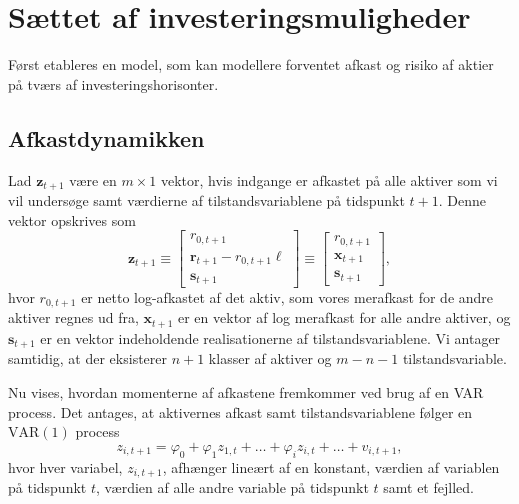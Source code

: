 \documentclass[
  a4paper,
  oneside]{memoir}
\begin{document}
\section{Sættet af investeringsmuligheder}

Først etableres en model, som kan modellere forventet afkast og risiko af aktier på tværs af investeringshorisonter.

\subsection{Afkastdynamikken}

Lad \(\bm{z}_{t+1}\) være en \(m\times 1\) vektor, hvis indgange er afkastet på alle aktiver som vi vil undersøge samt værdierne af tilstandsvariablene på tidspunkt \(t+1\). Denne vektor opskrives som
\begin{equation}
        \bm{z}_{t+1}\equiv
        \begin{bmatrix}
        r_{0,t+1}\\
        \bm{r}_{t+1}-r_{0,t+1}\bm{\ell}\\
        \bm{s}_{t+1}
        \end{bmatrix}\equiv
        \begin{bmatrix}
        r_{0,t+1}\\
        \bm{x}_{t+1}\\
        \bm{s}_{t+1}
        \end{bmatrix},
    \end{equation}
hvor \(r_{0,t+1}\) er netto log-afkastet af det aktiv, som vores merafkast for de andre aktiver regnes ud fra, \(\bm{x}_{t+1}\) er en vektor af log merafkast for alle andre aktiver, og \(\bm{s}_{t+1}\) er en vektor indeholdende realisationerne af tilstandsvariablene. Vi antager samtidig, at der eksisterer \(n+1\) klasser af aktiver og \(m-n-1\) tilstandsvariable.

\vspace{5mm}

Nu vises, hvordan momenterne af afkastene fremkommer ved brug af en VAR process. Det antages, at aktivernes afkast samt tilstandsvariablene følger en \(\text{VAR}(1)\) process
\begin{equation}
        z_{i,t+1}=\varphi_0+\varphi_1 z_{1,t}+\dots+\varphi_i z_{i,t}+\dots+v_{i,t+1},
    \end{equation}
hvor hver variabel, \(z_{i,t+1}\), afhænger lineært af en konstant, værdien af variablen på tidspunkt \(t\), værdien af alle andre variable på tidspunkt \(t\) samt et fejlled.
\end{document}
